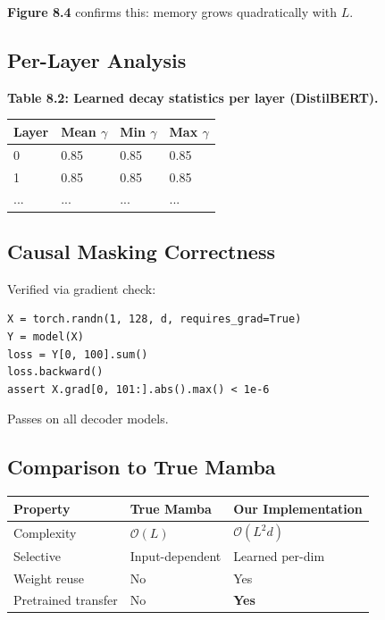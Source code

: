 \textbf{Figure 8.4} confirms this: memory grows quadratically with $L$.

\subsection{Per-Layer Analysis}

\textbf{Table 8.2: Learned decay statistics per layer (DistilBERT).}

\begin{table}[H]
\centering
\small
\begin{tabular}{llll}
\toprule
\textbf{Layer} & \textbf{Mean $\gamma$} & \textbf{Min $\gamma$} & \textbf{Max $\gamma$} \\
\midrule
0 & 0.85 & 0.85 & 0.85 \\
1 & 0.85 & 0.85 & 0.85 \\
... & ... & ... & ... \\
\bottomrule
\end{tabular}
\end{table}

\subsection{Causal Masking Correctness}

Verified via gradient check:

\begin{lstlisting}
X = torch.randn(1, 128, d, requires_grad=True)
Y = model(X)
loss = Y[0, 100].sum()
loss.backward()
assert X.grad[0, 101:].abs().max() < 1e-6
\end{lstlisting}

Passes on all decoder models.

\subsection{Comparison to True Mamba}

\begin{table}[H]
\centering
\small
\begin{tabular}{lll}
\toprule
\textbf{Property} & \textbf{True Mamba} & \textbf{Our Implementation} \\
\midrule
Complexity & $\mathcal{O}(L)$ & $\mathcal{O}(L^2 d)$ \\
Selective & Input-dependent & Learned per-dim \\
Weight reuse & No & Yes \\
Pretrained transfer & No & \textbf{Yes} \\
\bottomrule
\end{tabular}
\end{table}


